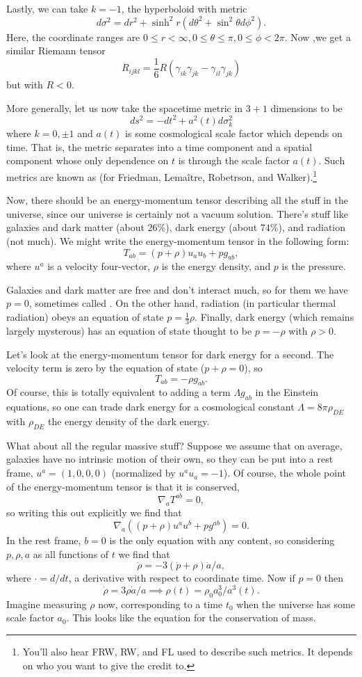 Lastly, we can take $k=-1$, the hyperboloid with metric $$d\sigma^2=dr^2+\sinh^2 r (d\theta^2 +\sin^2\theta d\phi^2).$$
Here, the coordinate ranges are $0\leq r < \infty, 0\leq \theta \leq \pi, 0\leq \phi < 2\pi.$ Now ,we get a similar Riemann tensor
$$R_{ijkl}=\frac{1}{6}R(\gamma_{ik}\gamma_{jk}-\gamma_{il}\gamma_{jk})$$
but with $R<0.$

\begin{defn}
More generally, let us now take the spacetime metric in $3+1$ dimensions to be
$$ds^2=-dt^2+a^2(t) d\sigma_k^2$$
where $k=0,\pm 1$ and $a(t)$ is some cosmological scale factor which depends on time. That is, the metric separates into a time component and a spatial component whose only dependence on $t$ is through the scale factor $a(t)$. Such metrics are known as  (for Friedman, Lema\^itre, Robetrson, and Walker).\footnote{You'll also hear FRW, RW, and FL used to describe such metrics. It depends on who you want to give the credit to.}
\end{defn}

Now, there should be an energy-momentum tensor describing all the stuff in the universe, since our universe is certainly not a vacuum solution. There's stuff like galaxies and dark matter (about $26$\%), dark energy (about $74$\%), and radiation (not much). We might write the energy-momentum tensor in the following form:
$$T_{ab}=(p+\rho)u_a u_b +p g_{ab},$$
where $u^a$ is a velocity four-vector, $\rho$ is the energy density, and $p$ is the pressure.

Galaxies and dark matter are free and don't interact much, so for them we have $p=0$, sometimes called . On the other hand, radiation (in particular thermal radiation) obeys an equation of state $p=\frac{1}{3}\rho$. Finally, dark energy (which remains largely mysterous) has an equation of state thought to be $p=-\rho$ with $\rho>0$.

Let's look at the energy-momentum tensor for dark energy for a second. The velocity term is zero by the equation of state ($p+\rho=0$), so
$$T_{ab}=-\rho g_{ab}.$$
Of course, this is totally equivalent to adding a term $\Lambda g_{ab}$ in the Einstein equations, so one can trade dark energy for a cosmological constant $\Lambda=8\pi \rho_{DE}$ with $\rho_{DE}$ the energy density of the dark energy.

What about all the regular massive stuff? Suppose we assume that on average, galaxies have no intrinsic motion of their own, so they can be put into a rest frame, $u^a=(1,0,0,0)$ (normalized by $u^a u_a=-1$). Of course, the whole point of the energy-momentum tensor is that it is conserved,
$$\nabla_a T^{ab}=0,$$
so writing this out explicitly we find that
$$\nabla_a((p+\rho)u^a u^b + p g^{ab})=0.$$
In the rest frame, $b=0$ is the only equation with any content, so considering $p,\rho,a$ as all functions of $t$ we find that
$$\dot \rho=-3(\dot p+\rho)\dot a/a,$$
where $\cdot=d/dt$, a derivative with respect to coordinate time. Now if $p=0$ then
$$\dot \rho =3\rho \dot a/a \implies \rho(t)=\rho_0 a_0^3/a^3(t).$$
Imagine measuring $\rho$ now, corresponding to a time $t_0$ when the universe has some scale factor $a_0$. This looks like the equation for the conservation of mass.